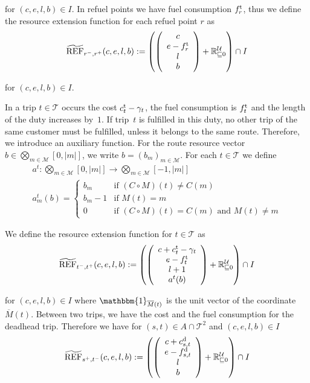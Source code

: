 for $(c,e,l,b)\in I$. In refuel points we have fuel consumption $f^{\operatorname{t}}_r$, thus we define the resource extension function for each refuel point $r$ as
\begin{align*}
	\widetilde{\operatorname{REF}}_{r^-,r^+}(c,e,l,b) := \left(\left(
	\begin{array}{c}
		c \\ e-f^{\operatorname{t}}_r \\ l \\ b
	\end{array}
	\right) + \mathbb{R}^{\mathcal{U}}_{\sqsubseteq 0}\right) \cap I
\end{align*}

for $(c,e,l,b)\in I$.

In a trip ${t\in\mathcal{T}}$ occurs the cost ${c^{\operatorname{t}}_t-\gamma_t}$, the fuel consumption is $f^{\operatorname{t}}_t$ and the length of the duty increases by~$1$. If trip~$t$ is fulfilled in this duty, no other trip of the same customer must be fulfilled, unless it belongs to the same route. Therefore, we introduce an auxiliary function. For the route resource vector ${b\in\bigotimes_{m\in\mathcal{M}}\left[0,|m|\right]}$, we write ${b=\left(b_m\right)_{m\in\mathcal{M}}}$. For each ${t\in\mathcal{T}}$ we define
\begin{gather*}
	a^t:\bigotimes_{m\in\mathcal{M}}\left[0,|m|\right] \to \bigotimes_{m\in\mathcal{M}}\left[-1,|m|\right] \\
	a^t_m(b) = \left\{ \begin{array}{cl} b_m & \text{if } \left(C\circ M\right)(t)\neq C(m) \\ b_m - 1 & \text{if } M(t)=m \\ 0 & \text{if } \left(C\circ M\right)(t)=C(m) \text{ and } M(t)\neq m \end{array} \right.
\end{gather*}

We define the resource extension function for $t\in\mathcal{T}$ as
\begin{align}
	\widetilde{\operatorname{REF}}_{t^-,t^+}(c,e,l,b) := \left(\left(
	\begin{array}{c}
		c+c^{\operatorname{t}}_t-\gamma_t \\ e-f^{\operatorname{t}}_t \\ l+1 \\ a^t(b)
	\end{array}
	\right) + \mathbb{R}^{\mathcal{U}}_{\sqsubseteq 0}\right) \cap I \label{eq:ref_trip}
\end{align}

for $(c,e,l,b)\in I$ where $\mathbbm{1}_{\overline{M}(t)}$ is the unit vector of the coordinate $\overline{M}(t)$. Between two trips, we have the cost and the fuel consumption for the deadhead trip. Therefore we have for ${(s,t)\in A\cap\mathcal{T}^2}$ and ${(c,e,l,b)\in I}$
\begin{align*}
	\widetilde{\operatorname{REF}}_{s^+,t^-}(c,e,l,b) := \left(\left(
	\begin{array}{c}
		c + c^{\operatorname{d}}_{s,t} \\ e-f^{\operatorname{d}}_{s,t} \\ l \\ b
	\end{array}
	\right) + \mathbb{R}^{\mathcal{U}}_{\sqsubseteq 0}\right) \cap I
\end{align*}

